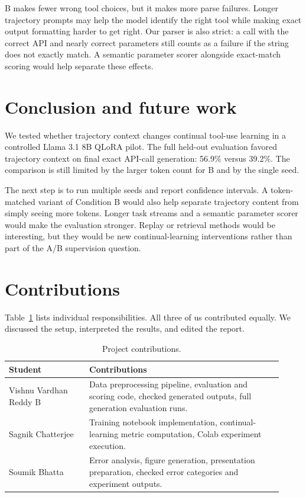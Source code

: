 \documentclass{article}
\begin{document}
B makes fewer wrong tool choices, but it makes more parse failures. Longer trajectory prompts may help the model identify the right tool while making exact output formatting harder to get right. Our parser is also strict: a call with the correct API and nearly correct parameters still counts as a failure if the string does not exactly match. A semantic parameter scorer alongside exact-match scoring would help separate these effects.

\section{Conclusion and future work}

We tested whether trajectory context changes continual tool-use learning in a controlled Llama 3.1 8B QLoRA pilot. The full held-out evaluation favored trajectory context on final exact API-call generation: 56.9\% versus 39.2\%. The comparison is still limited by the larger token count for B and by the single seed.

The next step is to run multiple seeds and report confidence intervals. A token-matched variant of Condition B would also help separate trajectory content from simply seeing more tokens. Longer task streams and a semantic parameter scorer would make the evaluation stronger. Replay or retrieval methods would be interesting, but they would be new continual-learning interventions rather than part of the A/B supervision question.

\section{Contributions}

Table~\ref{tab:contrib} lists individual responsibilities. All three of us contributed equally. We discussed the setup, interpreted the results, and edited the report.

\begin{table}[h]
\centering
\caption{Project contributions.}
\label{tab:contrib}
\small
\setlength{\tabcolsep}{4pt}
\begin{tabular}{p{0.27\linewidth}p{0.65\linewidth}}
\toprule
Student & Contributions \\
\midrule
Vishnu Vardhan Reddy B & Data preprocessing pipeline, evaluation and scoring code, checked generated outputs, full generation evaluation runs. \\
Sagnik Chatterjee & Training notebook implementation, continual-learning metric computation, Colab experiment execution. \\
Soumik Bhatta & Error analysis, figure generation, presentation preparation, checked error categories and experiment outputs. \\
\bottomrule
\end{tabular}
\end{table}
\end{document}
